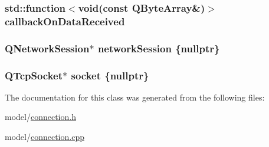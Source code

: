 \subsubsection[{\texorpdfstring{callback\+On\+Data\+Received}{callbackOnDataReceived}}]{\setlength{\rightskip}{0pt plus 5cm}std\+::function$<$void(const Q\+Byte\+Array\&)$>$ callback\+On\+Data\+Received\hspace{0.3cm}{\ttfamily [protected]}}\hypertarget{classMODEL_1_1Connection_aa0b44072225e1b07b646bd973719ac80}{}\label{classMODEL_1_1Connection_aa0b44072225e1b07b646bd973719ac80}
\subsubsection[{\texorpdfstring{network\+Session}{networkSession}}]{\setlength{\rightskip}{0pt plus 5cm}Q\+Network\+Session$\ast$ network\+Session \{nullptr\}\hspace{0.3cm}{\ttfamily [private]}}\hypertarget{classMODEL_1_1Connection_a24862c1b1d3d8d16843535cf9ec65dc2}{}\label{classMODEL_1_1Connection_a24862c1b1d3d8d16843535cf9ec65dc2}
\subsubsection[{\texorpdfstring{socket}{socket}}]{\setlength{\rightskip}{0pt plus 5cm}Q\+Tcp\+Socket$\ast$ socket \{nullptr\}\hspace{0.3cm}{\ttfamily [protected]}}\hypertarget{classMODEL_1_1Connection_a0558920c8ed7149d80c3051117c2d60f}{}\label{classMODEL_1_1Connection_a0558920c8ed7149d80c3051117c2d60f}


The documentation for this class was generated from the following files\+:\begin{DoxyCompactItemize}
\item 
model/\hyperlink{connection_8h}{connection.\+h}\item 
model/\hyperlink{connection_8cpp}{connection.\+cpp}\end{DoxyCompactItemize}
